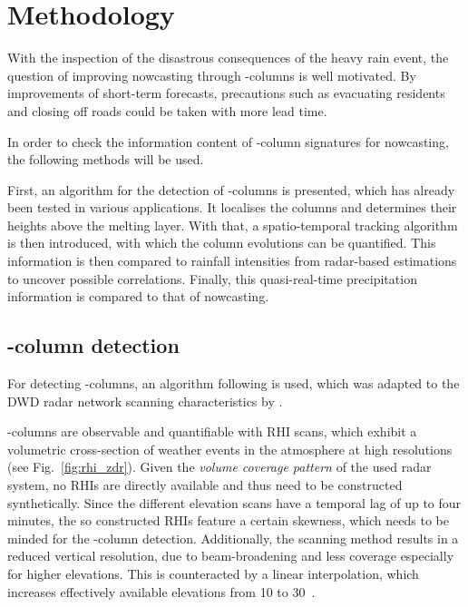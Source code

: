 
\chapter{Methodology}
\label{sec:method}
With the inspection of the disastrous consequences of the heavy rain event, the question of improving nowcasting through \zdr-columns is well motivated. By improvements of short-term forecasts, precautions such as evacuating residents and closing off roads could be taken with more lead time.

In order to check the information content of \zdr-column signatures for nowcasting, the following methods will be used. 

First, an algorithm for the detection of \zdr-columns is presented, which has already been tested in various applications. It localises the columns and determines their heights above the melting layer.
With that, a spatio-temporal tracking algorithm is then introduced, with which the column evolutions can be quantified. This information is then compared to rainfall intensities from radar-based estimations to uncover possible correlations. Finally, this quasi-real-time precipitation information is compared to that of nowcasting.

\section{\zdr-column detection}
\label{sec:zdr-c_detection}
For detecting \zdr-columns, an algorithm following \textcite{snyder} is used, which was adapted to the DWD radar network scanning characteristics by \textcite{mari}.

\zdr-columns are observable and quantifiable with RHI scans, which exhibit a volumetric cross-section of weather events in the atmosphere at high resolutions (see Fig.~\ref{fig:rhi_zdr}). Given the \emph{volume coverage pattern} of the used radar system, no RHIs are directly available and thus need to be constructed synthetically. Since the different elevation scans have a temporal lag of up to four minutes, the so constructed RHIs feature a certain skewness, which needs to be minded for the \zdr-column detection. Additionally, the scanning method results in a reduced vertical resolution, due to beam-broadening and less coverage especially for higher elevations. This is counteracted by a linear interpolation, which increases effectively available elevations from 10 to 30~\cite[p.~70]{mari}.

